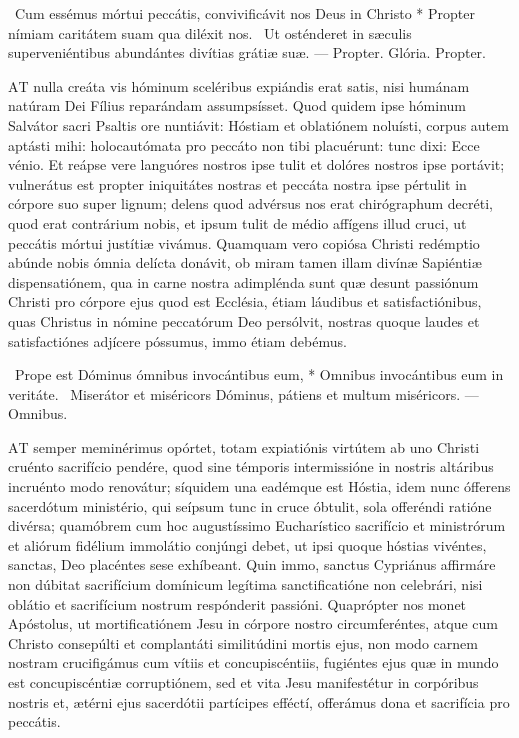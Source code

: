 \R\ Cum essémus mórtui peccátis, convivificávit nos Deus in Christo * Propter nímiam caritátem suam qua diléxit nos. \V\ Ut osténderet in sæculis superveniéntibus abundántes divítias grátiæ suæ. --- Propter. Glória. Propter.




\lettrine[lines=2]{A}{T} nulla creáta vis hóminum sceléribus expiándis erat satis, nisi humánam natúram Dei Fílius reparándam assumpsísset. Quod quidem ipse hóminum Salvátor sacri Psaltis ore nuntiávit: Hóstiam et oblatiónem noluísti, corpus autem aptásti mihi: holocautómata pro peccáto non tibi placuérunt: tunc dixi: Ecce vénio. Et reápse vere languóres nostros ipse tulit et dolóres nostros ipse portávit; vulnerátus est propter iniquitátes nostras et peccáta nostra ipse pértulit in córpore suo super lignum; delens quod advérsus nos erat chirógraphum decréti, quod erat contrárium nobis, et ipsum tulit de médio affígens illud cruci, ut peccátis mórtui justítiæ vivámus. Quamquam vero copiósa Christi redémptio abúnde nobis ómnia delícta donávit, ob miram tamen illam divínæ Sapiéntiæ dispensatiónem, qua in carne nostra adimplénda sunt quæ desunt passiónum Christi pro córpore ejus quod est Ecclésia, étiam láudibus et satisfactiónibus, quas Christus in nómine peccatórum Deo persólvit, nostras quoque laudes et satisfactiónes adjícere póssumus, immo étiam debémus.

\R\ Prope est Dóminus ómnibus invocántibus eum, * Omnibus invocántibus eum in veritáte. \V\ Miserátor et miséricors Dóminus, pátiens et multum miséricors. --- Omnibus.


\lettrine[lines=2]{A}{T} semper meminérimus opórtet, totam expiatiónis virtútem ab uno Christi cruénto sacrifício pendére, quod sine témporis intermissióne in nostris altáribus incruénto modo renovátur; síquidem una eadémque est Hóstia, idem nunc ófferens sacerdótum ministério, qui seípsum tunc in cruce óbtulit, sola offeréndi ratióne divérsa; quamóbrem cum hoc augustíssimo Eucharístico sacrifício et ministrórum et aliórum fidélium immolátio conjúngi debet, ut ipsi quoque hóstias vivéntes, sanctas, Deo placéntes sese exhíbeant. Quin immo, sanctus Cypriánus affirmáre non dúbitat sacrifícium domínicum legítima sanctificatióne non celebrári, nisi oblátio et sacrifícium nostrum respónderit passióni. Quaprópter nos monet Apóstolus, ut mortificatiónem Jesu in córpore nostro circumferéntes, atque cum Christo consepúlti et complantáti similitúdini mortis ejus, non modo carnem nostram crucifigámus cum vítiis et concupiscéntiis, fugiéntes ejus quæ in mundo est concupiscéntiæ corruptiónem, sed et vita Jesu manifestétur in corpóribus nostris et, ætérni ejus sacerdótii partícipes efféctí, offerámus dona et sacrifícia pro peccátis.

